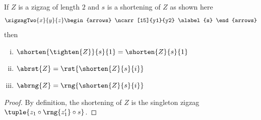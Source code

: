\begin{lemma}
\end{lemma}
If $Z$ is a zigzag of length $2$ and $s$ is a shortening of $Z$
as shown here
\[
\zigzagTwo{x}{y}{z}
\begin{arrows}
\ncarr[15]{y1}{y2} \alabel{s}
\end{arrows}
\]
then
\begin{enumerate}[(i)]
\item 
$\shorten{\tighten{Z}}{s}{1} = \shorten{Z}{s}{1}$
\item 
$\abrst{Z} = \rst{\shorten{Z}{s}{i}}$ 
\item
$\abrng{Z} = \rng{\shorten{Z}{s}{i}}$ 
\end{enumerate}
\begin{proof}
By definition, the shortening of $Z$
is the singleton zigzag
$\tuple{z_1 \circ \rng{z'_1} \circ s}$.


\end{proof}
